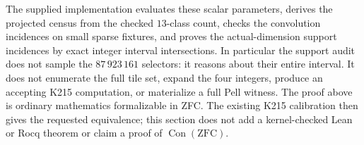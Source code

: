 The supplied implementation evaluates these scalar parameters, derives
the projected census from the checked $13$-class count, checks the
convolution incidences on small sparse fixtures, and proves the
actual-dimension support incidences by exact integer interval
intersections.  In particular the support audit does not sample the
$87\,923\,161$ selectors: it reasons about their entire interval.
It does not enumerate the full tile set, expand the four integers,
produce an accepting K215 computation, or materialize a full Pell witness.
The proof above is ordinary mathematics formalizable in ZFC.  The existing
K215 calibration then gives the requested equivalence; this section does
not add a kernel-checked Lean or Rocq theorem or claim a proof of
$\operatorname{Con}(\mathrm{ZFC})$.
